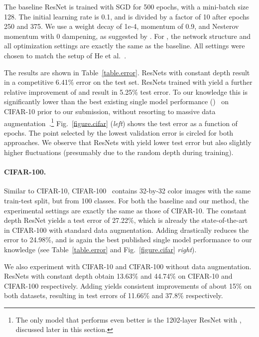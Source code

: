 \documentclass[runningheads]{llncs}
\begin{document}
The baseline ResNet is trained with SGD for 500 epochs, with a mini-batch size 128. The initial learning rate is 0.1, and is divided by a factor of 10 after epochs 250 and 375. We use a weight decay of 1e-4, momentum of 0.9, and Nesterov momentum \cite{sutskever2013importance} with 0 dampening, as suggested by \cite{blogpostresnet}. For \name{}, the network structure and all optimization settings are exactly the same as the baseline. All settings were chosen to match the setup of He et al.~\cite{he2015deep}.

The results are shown in Table~\ref{table.error}. ResNets with constant depth result in a competitive 6.41\% error on the test set. ResNets trained with \name{} yield a further relative improvement of  and result in 5.25\% test error.
To our knowledge this is significantly lower than the best existing single model performance ()~\cite{lee2015generalizing} on CIFAR-10 prior to our submission, without resorting to massive data augmentation~\cite{graham2014fractional,springenberg2014striving}.\footnote{The only model that performs even better is the 1202-layer ResNet with \name{}, discussed later in this section. }
Fig.~\ref{figure.cifar} (\textit{left}) shows the test error as a function of epochs. The point selected by the lowest validation error is circled for both approaches. We observe that ResNets with \name{} yield lower test error but also slightly higher fluctuations (presumably due to the random depth during training).

\paragraph{\textbf{CIFAR-100.}}
Similar to CIFAR-10, CIFAR-100~\cite{krizhevsky2009learning} contains 32-by-32 color images with the same train-test split, but from 100 classes. For both the baseline and our method, the experimental settings are exactly the same as those of CIFAR-10. The constant depth ResNet yields a test error of 27.22\%, which is already the state-of-the-art in CIFAR-100 with standard data augmentation. Adding \name{} drastically reduces the error to 24.98\%, and is again the best published single model performance to our knowledge (see Table~\ref{table.error} and Fig.~\ref{figure.cifar} \textit{right}).

We also experiment with CIFAR-10 and CIFAR-100 without data augmentation. ResNets with constant depth obtain 13.63\% and 44.74\% on CIFAR-10 and CIFAR-100 respectively. Adding \name{} yields consistent improvements of about 15\% on both datasets, resulting in test errors of 11.66\%  and 37.8\% respectively.
\end{document}
